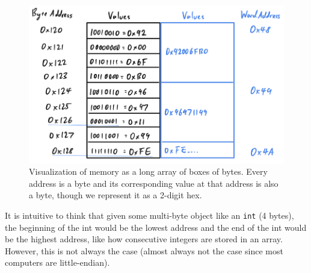 \begin{definition}[Memory]
    \begin{figure}[H]
      \centering 
      \includegraphics[scale=0.4]{img/memory_visual_byte.png}
      \caption{Visualization of memory as a long array of boxes of bytes. Every address is a byte and its corresponding value at that address is also a byte, though we represent it as a 2-digit hex. } 
      \label{fig:memory_visual_byte}
    \end{figure}
  \end{definition}

  It is intuitive to think that given some multi-byte object like an \texttt{int} (4 bytes), the beginning of the int would be the lowest address and the end of the int would be the highest address, like how consecutive integers are stored in an array. However, this is not always the case (almost always not the case since most computers are little-endian).  

